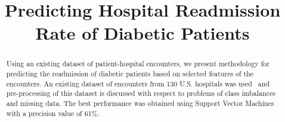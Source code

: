 \documentclass[conference]{IEEEtran}
\begin{document}
%
\title{Predicting Hospital Readmission Rate of Diabetic Patients}


\author{
\and
{}
\and
{}
}

\maketitle


\begin{abstract}

Using an existing dataset of patient-hospital encounters, we present methodology for predicting the readmission of diabetic patients based on selected features of the encounters. An existing dataset of encounters from 130 U.S. hospitals was used~\cite{dataset-2014} and pre-processing of this dataset is discussed with respect to problems of class imbalances and missing data. The best performance was obtained using Support Vector Machines with a precision value of 61\%.

\end{abstract}


%
\end{document}
